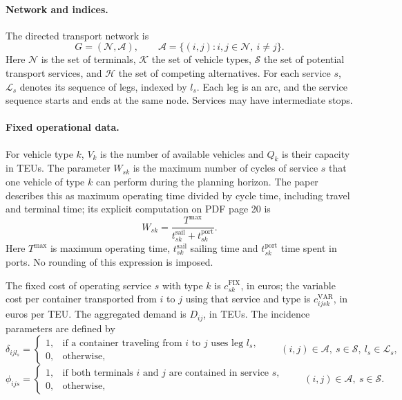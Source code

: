 \documentclass{article}
\begin{document}
\paragraph{Network and indices.}
The directed transport network is
\[
G=(\mathcal N,\mathcal A),\qquad
\mathcal A=\{(i,j):i,j\in\mathcal N,\ i\ne j\}.
\]
Here \(\mathcal N\) is the set of terminals, \(\mathcal K\) the set of vehicle types, \(\mathcal S\) the set of potential transport services, and \(\mathcal H\) the set of competing alternatives. For each service \(s\), \(\mathcal L_s\) denotes its sequence of legs, indexed by \(l_s\). Each leg is an arc, and the service sequence starts and ends at the same node. Services may have intermediate stops.

\paragraph{Fixed operational data.}
For vehicle type \(k\), \(V_k\) is the number of available vehicles and \(Q_k\) is their capacity in TEUs. The parameter \(W_{sk}\) is the maximum number of cycles of service \(s\) that one vehicle of type \(k\) can perform during the planning horizon. The paper describes this as maximum operating time divided by cycle time, including travel and terminal time; its explicit computation on PDF page 20 is
\[
W_{sk}=\frac{T^{\max}}{t_{sk}^{\mathrm{sail}}+t_{sk}^{\mathrm{port}}}.
\]
Here \(T^{\max}\) is maximum operating time, \(t_{sk}^{\mathrm{sail}}\) sailing time and \(t_{sk}^{\mathrm{port}}\) time spent in ports. No rounding of this expression is imposed.

The fixed cost of operating service \(s\) with type \(k\) is \(c_{sk}^{\mathrm{FIX}}\), in euros; the variable cost per container transported from \(i\) to \(j\) using that service and type is \(c_{ijsk}^{\mathrm{VAR}}\), in euros per TEU. The aggregated demand is \(D_{ij}\), in TEUs. The incidence parameters are defined by
\[
\delta_{ijl_s}=\begin{cases}
1,&\text{if a container traveling from }i\text{ to }j\text{ uses leg }l_s,\\
0,&\text{otherwise},
\end{cases}
\qquad (i,j)\in\mathcal A,\ s\in\mathcal S,\ l_s\in\mathcal L_s,
\]
\[
\phi_{ijs}=\begin{cases}
1,&\text{if both terminals }i\text{ and }j\text{ are contained in service }s,\\
0,&\text{otherwise},
\end{cases}
\qquad (i,j)\in\mathcal A,\ s\in\mathcal S.
\]
\end{document}
